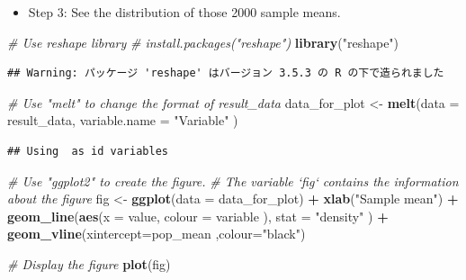 \documentclass[]{book}
\newenvironment{Shaded}{\begin{snugshade}}{\end{snugshade}}
\newcommand{\KeywordTok}[1]{\textcolor[rgb]{0.13,0.29,0.53}{\textbf{#1}}}
\newcommand{\DataTypeTok}[1]{\textcolor[rgb]{0.13,0.29,0.53}{#1}}
\newcommand{\StringTok}[1]{\textcolor[rgb]{0.31,0.60,0.02}{#1}}
\newcommand{\CommentTok}[1]{\textcolor[rgb]{0.56,0.35,0.01}{\textit{#1}}}
\newcommand{\OperatorTok}[1]{\textcolor[rgb]{0.81,0.36,0.00}{\textbf{#1}}}
\newcommand{\NormalTok}[1]{#1}
\providecommand{\tightlist}{%
  \setlength{\itemsep}{0pt}\setlength{\parskip}{0pt}}
\begin{document}
\begin{itemize}
\tightlist
\item
  Step 3: See the distribution of those 2000 sample means.
\end{itemize}

\begin{Shaded}
\begin{Highlighting}[]
\CommentTok{# Use reshape library}
\CommentTok{# install.packages("reshape")}
\KeywordTok{library}\NormalTok{(}\StringTok{"reshape"}\NormalTok{)}
\end{Highlighting}
\end{Shaded}

\begin{verbatim}
## Warning: パッケージ 'reshape' はバージョン 3.5.3 の R の下で造られました
\end{verbatim}

\begin{Shaded}
\begin{Highlighting}[]
\CommentTok{# Use "melt" to change the format of result_data}
\NormalTok{data_for_plot <-}\StringTok{ }\KeywordTok{melt}\NormalTok{(}\DataTypeTok{data =}\NormalTok{ result_data, }\DataTypeTok{variable.name =} \StringTok{"Variable"}\NormalTok{ )}
\end{Highlighting}
\end{Shaded}

\begin{verbatim}
## Using  as id variables
\end{verbatim}

\begin{Shaded}
\begin{Highlighting}[]
\CommentTok{# Use "ggplot2" to create the figure.}
\CommentTok{# The variable `fig` contains the information about the figure}
\NormalTok{fig <-}\StringTok{ }
\StringTok{  }\KeywordTok{ggplot}\NormalTok{(}\DataTypeTok{data =}\NormalTok{ data_for_plot) }\OperatorTok{+}
\StringTok{  }\KeywordTok{xlab}\NormalTok{(}\StringTok{"Sample mean"}\NormalTok{) }\OperatorTok{+}\StringTok{ }
\StringTok{  }\KeywordTok{geom_line}\NormalTok{(}\KeywordTok{aes}\NormalTok{(}\DataTypeTok{x =}\NormalTok{ value, }\DataTypeTok{colour =}\NormalTok{ variable ),   }\DataTypeTok{stat =} \StringTok{"density"}\NormalTok{ ) }\OperatorTok{+}\StringTok{ }
\StringTok{  }\KeywordTok{geom_vline}\NormalTok{(}\DataTypeTok{xintercept=}\NormalTok{pop_mean ,}\DataTypeTok{colour=}\StringTok{"black"}\NormalTok{)}

\CommentTok{# Display the figure }
\KeywordTok{plot}\NormalTok{(fig)}
\end{Highlighting}
\end{Shaded}
\end{document}
